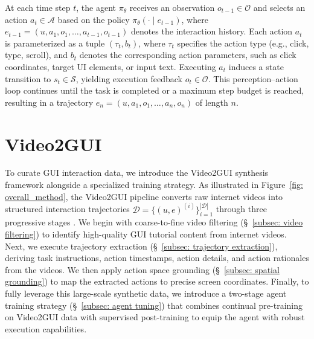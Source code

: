 \documentclass{llmxive}
\begin{document}
At each time step $t$, the agent $\pi_\theta$ receives an observation $o_{t-1} \in \mathcal{O}$ and selects an action $a_t \in \mathcal{A}$ based on the policy $\pi_\theta(\cdot \mid e_{t-1})$, where
$e_{t-1} = (u, a_1, o_1, \ldots, a_{t-1}, o_{t-1})$ denotes the interaction history.
Each action $a_t$ is parameterized as a tuple $(\tau_t, b_t)$, where $\tau_t$ specifies the action type (e.g., click, type, scroll), and $b_t$ denotes the corresponding action parameters, such as click coordinates, target UI elements, or input text.
Executing $a_t$ induces a state transition to $s_t \in \mathcal{S}$, yielding execution feedback $o_t \in \mathcal{O}$.
This perception–action loop continues until the task is completed or a maximum step budget is reached, resulting in a trajectory
$e_n = (u, a_1, o_1, \ldots, a_n, o_n)$ of length $n$.

\section{Video2GUI}
To curate GUI interaction data,
we introduce the Video2GUI synthesis framework alongside a specialized training strategy. As illustrated in Figure~\ref{fig: overall_method}, the Video2GUI pipeline converts raw internet videos into structured interaction trajectories $\mathcal{D}=\{(u,e)^{(i)}\}_{i=1}^{|\mathcal{D}|}$ through three progressive stages .
We begin with coarse-to-fine video filtering (\S~\ref{subsec: video filtering}) to identify high-quality GUI tutorial content from internet videos.
Next, we execute trajectory extraction (\S~\ref{subsec: trajectory extraction}), deriving task instructions, action timestamps, action details, and action rationales from the videos.
We then apply action space grounding (\S~\ref{subsec: spatial grounding}) to map the extracted actions to precise screen coordinates. Finally, to fully leverage this large-scale synthetic data, we introduce a two-stage agent training strategy (\S~\ref{subsec: agent tuning}) that combines continual pre-training on Video2GUI data with supervised post-training to equip the agent with robust execution capabilities.
\end{document}
